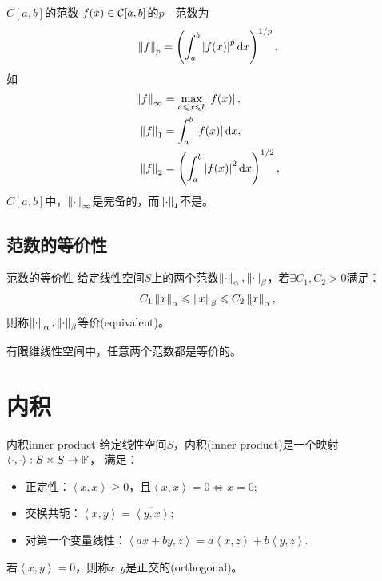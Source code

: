 \begin{example}
    {$C[a,b]$的范数}{}
    $f(x)\in\mathcal C[a,b]$的$p$ - 范数为
    \[
        \left\lVert f\right\rVert_p=\left(\int_a^b\left\lvert f(x)\right\rvert^p\mathop{}\!\mathrm{d} x\right)^{1/p}.
    \]
    如
    \begin{subequations}
        \begin{align}
            \left\lVert f\right\rVert_\infty&=\max_{a\leqslant x\leqslant b}\left\lvert f(x)\right\rvert,\\
            \left\lVert f\right\rVert_1&=\int_a^b\left\lvert f(x)\right\rvert\mathop{}\!\mathrm{d} x,\\
            \left\lVert f\right\rVert_2&=\left(\int_a^b\left\lvert f(x)\right\rvert^2\mathop{}\!\mathrm{d} x\right)^{1/2},
        \end{align}
    \end{subequations}
    $C[a,b]$中，$\left\lVert\cdot\right\rVert_\infty$是完备的，而$\left\lVert\cdot\right\rVert_1$不是。
\end{example}

\subsection{范数的等价性}

\begin{definition}
    {范数的等价性}{}
    给定线性空间$S$上的两个范数$\left\lVert\cdot\right\rVert_\alpha,\left\lVert\cdot\right\rVert_\beta$，若$\exists C_1,C_2>0$满足：
    \[
        C_1\left\lVert x\right\rVert_\alpha\leqslant\left\lVert x\right\rVert_\beta\leqslant C_2\left\lVert x\right\rVert_\alpha,
    \]
    则称$\left\lVert\cdot\right\rVert_\alpha,\left\lVert\cdot\right\rVert_\beta$等价(equivalent)。
\end{definition}

\begin{theorem}
    {}{}
    有限维线性空间中，任意两个范数都是等价的。
\end{theorem}


\section{内积}
\label{sec:inner product}

\newcommand{\inp}[2]{\left\langle #1,#2\right\rangle}  %


\begin{definition}
    {内积}{inner product}
    给定线性空间$S$，内积(inner product)是一个映射$\inp\cdot\cdot:S\times S\to\FF$，
    满足：
    \begin{itemize}
        \item 正定性：$\inp xx\geq 0$，且$\inp xx=0\iff x=0;$
        \item 交换共轭：$\inp xy=\overline{\inp yx};$
        \item 对第一个变量线性：$\inp{ax+by}z=a\inp xz+b\inp yz.$
    \end{itemize}
    若$\inp xy=0$，则称$x,y$是正交的(orthogonal)。
\end{definition}

